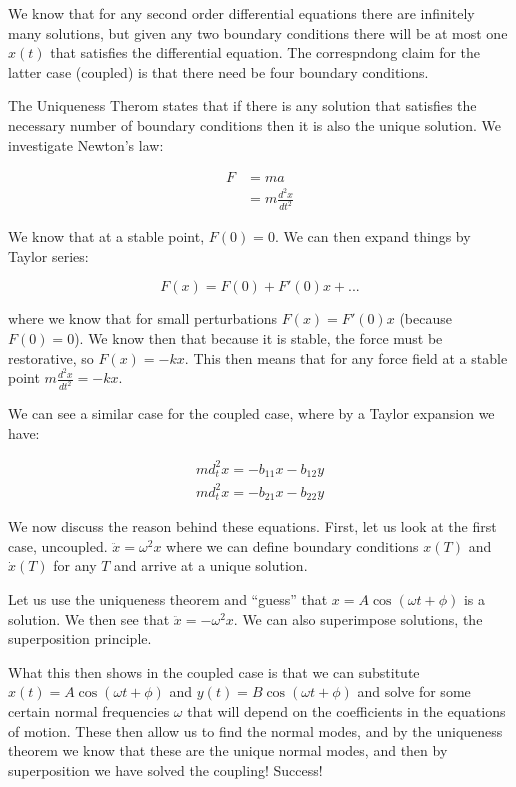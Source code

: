 \documentclass{report}
\begin{document}
We know that for any second order differential equations there are infinitely many solutions, but given any two boundary conditions there will be at most one $x(t)$ that satisfies the differential equation. The correspndong claim for the latter case (coupled) is that there need be four boundary conditions.

The Uniqueness Therom states that if there is any solution that satisfies the necessary number of boundary conditions then it is also the unique solution. We investigate Newton's law:

\begin{align*}
F &= ma\\
&= m\frac{d^2x}{dt^2}
\end{align*}

We know that at a stable point, $F(0) = 0$. We can then expand things by Taylor series:

$$F(x) = F(0) + F'(0)x +...$$

where we know that for small perturbations $F(x) = F'(0)x$ (because $F(0) = 0$). We know then that because it is stable, the force must be restorative, so $F(x) = -kx$. This then means that for any force field at a stable point $m\frac{d^2x}{dt^2} = -kx$.

We can see a similar case for the coupled case, where by a Taylor expansion we have:

\begin{align*}
md_t^2x = -b_{11}x - b_{12}y\\
md_t^2x = -b_{21}x - b_{22}y
\end{align*}

We now discuss the reason behind these equations. First, let us look at the first case, uncoupled. $\ddot{x} = \omega^2x$ where we can define boundary conditions $x(T)$ and $\dot{x}(T)$ for any $T$ and arrive at a unique solution.

Let us use the uniqueness theorem and "`guess"' that $x = A\cos(\omega t + \phi)$ is a solution. We then see that $\ddot{x} = -\omega^2x$. We can also superimpose solutions, the superposition principle.

What this then shows in the coupled case is that we can substitute $x(t) = A\cos(\omega t + \phi)$ and $y(t) = B \cos(\omega t + \phi)$ and solve for some certain normal frequencies $\omega$ that will depend on the coefficients in the equations of motion. These then allow us to find the normal modes, and by the uniqueness theorem we know that these are the unique normal modes, and then by superposition we have solved the coupling! Success!
\end{document}
